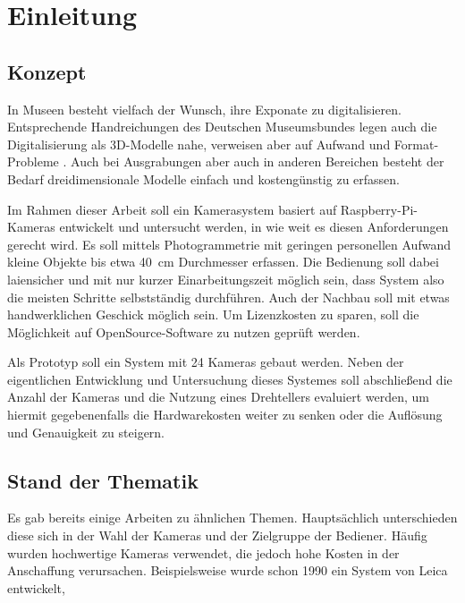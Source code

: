 \documentclass[./00PhotoBox.tex]{subfiles}
\begin{document}
\chapter{Einleitung}

\section{Konzept}

In Museen besteht vielfach der Wunsch, ihre Exponate zu digitalisieren. Entsprechende Handreichungen des Deutschen Museumsbundes legen auch die Digitalisierung als 3D-Modelle nahe, verweisen aber auf Aufwand und Format-Probleme \citep[S. 43]{handreichung_digital}.
Auch bei Ausgrabungen aber auch in anderen Bereichen besteht der Bedarf dreidimensionale Modelle einfach und kostengünstig zu erfassen.

Im Rahmen dieser Arbeit soll ein Kamerasystem basiert auf Raspberry-Pi-Kameras entwickelt und untersucht werden, in wie weit es diesen Anforderungen gerecht wird. Es soll mittels Photogrammetrie mit geringen personellen Aufwand kleine Objekte bis etwa 40~cm Durchmesser erfassen. Die Bedienung soll dabei laiensicher und mit nur kurzer Einarbeitungszeit möglich sein, dass System also die meisten Schritte selbstständig durchführen. Auch der Nachbau soll mit etwas handwerklichen Geschick möglich sein. Um Lizenzkosten zu sparen, soll die Möglichkeit auf OpenSource-Software zu nutzen geprüft werden.

Als Prototyp soll ein System mit 24 Kameras gebaut werden. Neben der eigentlichen Entwicklung und Untersuchung dieses Systemes soll abschließend die Anzahl der Kameras und die Nutzung eines Drehtellers evaluiert werden, um hiermit gegebenenfalls die Hardwarekosten weiter zu senken oder die Auflösung und Genauigkeit zu steigern.


\section{Stand der Thematik}

Es gab bereits einige Arbeiten zu ähnlichen Themen. Hauptsächlich unterschieden diese sich in der Wahl der Kameras und der Zielgruppe der Bediener. Häufig wurden hochwertige Kameras verwendet, die jedoch hohe Kosten in der Anschaffung verursachen. Beispielsweise wurde schon 1990 ein System von Leica entwickelt,



\biblio
\end{document}
